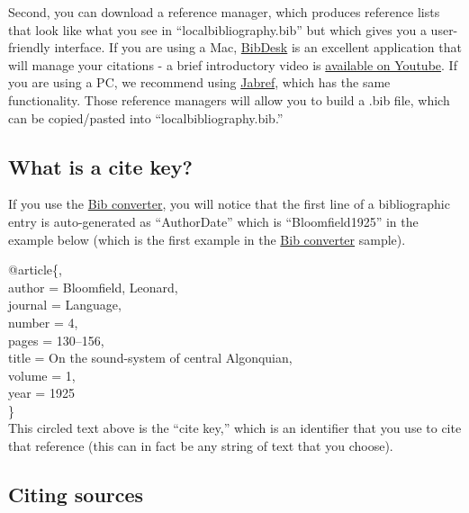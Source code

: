 \documentclass[output=paper,colorlinks,citecolor=brown]{langscibook}
\begin{document}
Second, you can download a reference manager, which produces reference lists that look like what you see in ``localbibliography.bib'' but which gives you a user-friendly interface. If you are using a Mac, \href{https://bibdesk.sourceforge.io}{BibDesk} is an excellent application that will manage your citations - a brief introductory video is \href{https://www.youtube.com/watch?v=sOxf1bKAxqQ}{available on Youtube}. If you are using a PC, we recommend using \href{http://www.jabref.org}{Jabref}, which has the same functionality. Those reference managers will allow you to build a .bib file, which can be copied/pasted into ``localbibliography.bib.'' 

\subsection{What is a cite key?}

If you use the \href{http://glottotopia.org/doc2tex/doc2bib}{Bib converter}, you will notice that the first line of a bibliographic entry is auto-generated as ``AuthorDate'' which is ``Bloomfield1925'' in the example below (which is the first example in the \href{http://glottotopia.org/doc2tex/doc2bib}{Bib converter} sample). 

\indent @article\{, \\
\indent \indent author = {Bloomfield, Leonard}, \\
\indent\indent journal = {Language}, \\
\indent\indent number = {4},\\
\indent\indent pages = {130--156},\\
\indent\indent title = {On the sound-system of central {Algonquian}},\\
\indent\indent volume = {1},\\
\indent\indent year = {1925}\\
\indent\indent\} \\

\noindent This circled text above is the ``cite key,'' which is an identifier that you use to cite that reference (this can in fact be any string of text that you choose).

\subsection{Citing sources}
\end{document}

